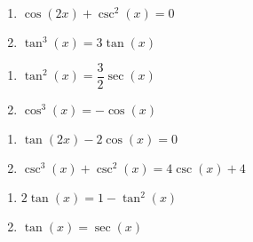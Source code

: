 \begin{multicols}{2}

\begin{enumerate}

\setcounter{enumi}{\value{HW}}

\item  $\cos(2x) + \csc^{2}(x) = 0$
\item $\tan^{3} \left( x \right) = 3\tan \left( x \right)$

\setcounter{HW}{\value{enumi}}

\end{enumerate}

\end{multicols}

\begin{multicols}{2}

\begin{enumerate}

\setcounter{enumi}{\value{HW}}

\item $\tan^{2} \left( x \right) = \dfrac{3}{2} \sec \left( x \right)$
\item $\cos^{3} \left( x \right) = -\cos \left( x \right)$ 

\setcounter{HW}{\value{enumi}}

\end{enumerate}

\end{multicols}

\begin{multicols}{2}

\begin{enumerate}

\setcounter{enumi}{\value{HW}}

\item $\tan (2x) - 2\cos(x) = 0$
\item $\csc^{3}(x) + \csc^{2}(x) = 4\csc(x) + 4$

\setcounter{HW}{\value{enumi}}

\end{enumerate}

\end{multicols}
\enlargethispage{.5in}
\vspace{-.1in}
\begin{multicols}{2}

\begin{enumerate}

\setcounter{enumi}{\value{HW}}

\item $2\tan(x) = 1 - \tan^{2}(x)$
\item $\tan \left( x \right) = \sec \left( x \right)$ \label{solveidentlast}

\setcounter{HW}{\value{enumi}}

\end{enumerate}

\end{multicols}

